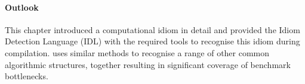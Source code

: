    \paragraph*{Outlook}
    This chapter introduced a computational idiom in detail and provided the
    Idiom Detection Language (IDL) with the required tools to recognise this
    idiom during compilation.
     uses similar methods to recognise a range of other
    common algorithmic structures, together resulting in significant coverage of
    benchmark bottlenecks.
